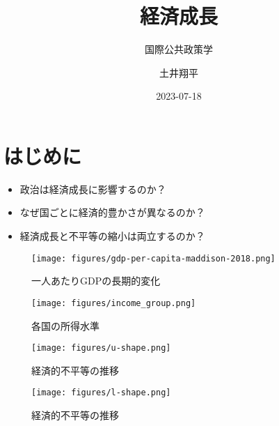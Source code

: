 \documentclass[
  xelatex,
  ja=standard]{bxjsarticle}
\title{経済成長}
\subtitle{国際公共政策学}
\author{土井翔平}
\date{2023-07-18}
\providecommand{\tightlist}{%
  \setlength{\itemsep}{0pt}\setlength{\parskip}{0pt}}\usepackage{longtable,booktabs,array}
\begin{document}
\maketitle
\ifdefined\Shaded\renewenvironment{Shaded}{\begin{tcolorbox}[frame hidden, borderline west={3pt}{0pt}{shadecolor}, sharp corners, interior hidden, boxrule=0pt, breakable, enhanced]}{\end{tcolorbox}}\fi

\hypertarget{ux306fux3058ux3081ux306b}{%
\section*{はじめに}\label{ux306fux3058ux3081ux306b}}

\begin{itemize}
\tightlist
\item
  政治は経済成長に影響するのか？
\item
  なぜ国ごとに経済的豊かさが異なるのか？
\item
  経済成長と不平等の縮小は両立するのか？
\end{itemize}

\begin{figure}[htpb]

{\centering \texttt{[image: figures/gdp-per-capita-maddison-2018.png]}

}

\caption{一人あたりGDPの長期的変化}

\end{figure}

\begin{figure}[htpb]

{\centering \texttt{[image: figures/income\_group.png]}

}

\caption{各国の所得水準}

\end{figure}

\begin{figure}[htpb]

{\centering \texttt{[image: figures/u-shape.png]}

}

\caption{経済的不平等の推移}

\end{figure}

\begin{figure}[htpb]

{\centering \texttt{[image: figures/l-shape.png]}

}

\caption{経済的不平等の推移}

\end{figure}
\end{document}
